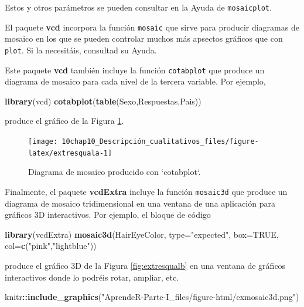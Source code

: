 \documentclass[
]{book}
\newenvironment{Shaded}{\begin{snugshade}}{\end{snugshade}}
\newcommand{\DataTypeTok}[1]{\textcolor[rgb]{0.13,0.29,0.53}{#1}}
\newcommand{\KeywordTok}[1]{\textcolor[rgb]{0.13,0.29,0.53}{\textbf{#1}}}
\newcommand{\NormalTok}[1]{#1}
\newcommand{\OperatorTok}[1]{\textcolor[rgb]{0.81,0.36,0.00}{\textbf{#1}}}
\newcommand{\OtherTok}[1]{\textcolor[rgb]{0.56,0.35,0.01}{#1}}
\newcommand{\StringTok}[1]{\textcolor[rgb]{0.31,0.60,0.02}{#1}}
\theoremstyle{definition}
\theoremstyle{definition}
\theoremstyle{definition}
\theoremstyle{remark}
\begin{document}
Estos y otros parámetros se pueden consultar en la Ayuda de \texttt{mosaicplot}.

El paquete \textbf{vcd} incorpora la función \texttt{mosaic} que sirve para producir diagramas de mosaico en los que se pueden controlar muchos más apsectos gráficos que con \texttt{plot}. Si la necesitáis, consultad su Ayuda.

Este paquete \textbf{vcd} también incluye la función \texttt{cotabplot} que produce un diagrama de mosaico para cada nivel de la tercera variable. Por ejemplo,

\begin{Shaded}
\begin{Highlighting}[]
\KeywordTok{library}\NormalTok{(vcd)}
\KeywordTok{cotabplot}\NormalTok{(}\KeywordTok{table}\NormalTok{(Sexo,Respuestas,Pais))}
\end{Highlighting}
\end{Shaded}

produce el gráfico de la Figura \ref{fig:extresquala}.

\begin{figure}

{\centering \texttt{[image: 10chap10\_Descripción\_cualitativos\_files/figure-latex/extresquala-1]} 

}

\caption{Diagrama de mosaico producido con `cotabplot`.}\label{fig:extresquala}
\end{figure}

Finalmente, el paquete \textbf{vcdExtra} incluye la función \texttt{mosaic3d} que produce un diagrama de mosaico tridimensional en una ventana de una aplicación para gráficos 3D interactivos. Por ejemplo, el bloque de código

\begin{Shaded}
\begin{Highlighting}[]
\KeywordTok{library}\NormalTok{(vcdExtra)}
\KeywordTok{mosaic3d}\NormalTok{(HairEyeColor, }\DataTypeTok{type=}\StringTok{"expected"}\NormalTok{, }\DataTypeTok{box=}\OtherTok{TRUE}\NormalTok{, }\DataTypeTok{col=}\KeywordTok{c}\NormalTok{(}\StringTok{"pink"}\NormalTok{,}\StringTok{"lightblue"}\NormalTok{))}
\end{Highlighting}
\end{Shaded}

produce el gráfico 3D de la Figura \ref{fig:extresqualb} en una ventana de gráficos interactivos donde lo podréis rotar, ampliar, etc.

\begin{Shaded}
\begin{Highlighting}[]
\NormalTok{knitr}\OperatorTok{::}\KeywordTok{include\_graphics}\NormalTok{(}\StringTok{"AprendeR{-}Parte{-}I\_files/figure{-}html/exmosaic3d.png"}\NormalTok{)}
\end{Highlighting}
\end{Shaded}
\end{document}
